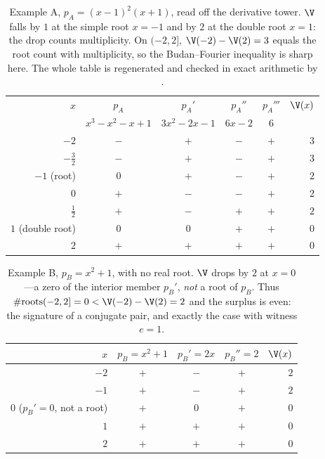 \begin{table}[t]
\centering\small
{}
\begin{tabular}{@{}rccccr@{}}
\toprule
\rowcolor{ggteal!18}
$x$ & $p_A$ & $p_A'$ & $p_A''$ & $p_A'''$ & $\V(x)$ \\
    & {\scriptsize$x^3{-}x^2{-}x{+}1$} & {\scriptsize$3x^2{-}2x{-}1$} & {\scriptsize$6x{-}2$} & {\scriptsize$6$} & \\
\midrule
$-2$            & $-$ & $+$ & $-$ & $+$ & $3$ \\
$-\tfrac32$     & $-$ & $+$ & $-$ & $+$ & $3$ \\
$-1$ {\scriptsize(root)}        & $0$ & $+$ & $-$ & $+$ & $2$ \\
$0$             & $+$ & $-$ & $-$ & $+$ & $2$ \\
$\tfrac12$      & $+$ & $-$ & $+$ & $+$ & $2$ \\
$1$ {\scriptsize(double root)}  & $0$ & $0$ & $+$ & $+$ & $0$ \\
$2$             & $+$ & $+$ & $+$ & $+$ & $0$ \\
\bottomrule
\end{tabular}
\caption{Example A, $p_A=(x-1)^2(x+1)$, read off the derivative tower. $\V$ falls by $1$ at the
simple root $x=-1$ and by $2$ at the double root $x=1$: the drop counts multiplicity. On $(-2,2]$,
$\V(-2)-\V(2)=3$ equals the root count with multiplicity, so the Budan--Fourier inequality is sharp
here. The whole table is regenerated and checked in exact arithmetic by .}
\label{tab:signsA}
\end{table}

\begin{table}[t]
\centering\small
{}
\begin{tabular}{@{}rcccr@{}}
\toprule
\rowcolor{ggteal!18}
$x$ & $p_B=x^2{+}1$ & $p_B'=2x$ & $p_B''=2$ & $\V(x)$ \\
\midrule
$-2$            & $+$ & $-$ & $+$ & $2$ \\
$-1$            & $+$ & $-$ & $+$ & $2$ \\
$0$ {\scriptsize($p_B'{=}0$, not a root)} & $+$ & $0$ & $+$ & $0$ \\
$1$             & $+$ & $+$ & $+$ & $0$ \\
$2$             & $+$ & $+$ & $+$ & $0$ \\
\bottomrule
\end{tabular}
\caption{Example B, $p_B=x^2+1$, with no real root. $\V$ drops by $2$ at $x=0$---a zero of the
interior member $p_B'$, \emph{not} a root of $p_B$. Thus $\#\mathrm{roots}(-2,2]=0<\V(-2)-\V(2)=2$
and the surplus is even: the signature of a conjugate pair, and exactly the
 case with witness $e=1$.}
\label{tab:signsB}
\end{table}


